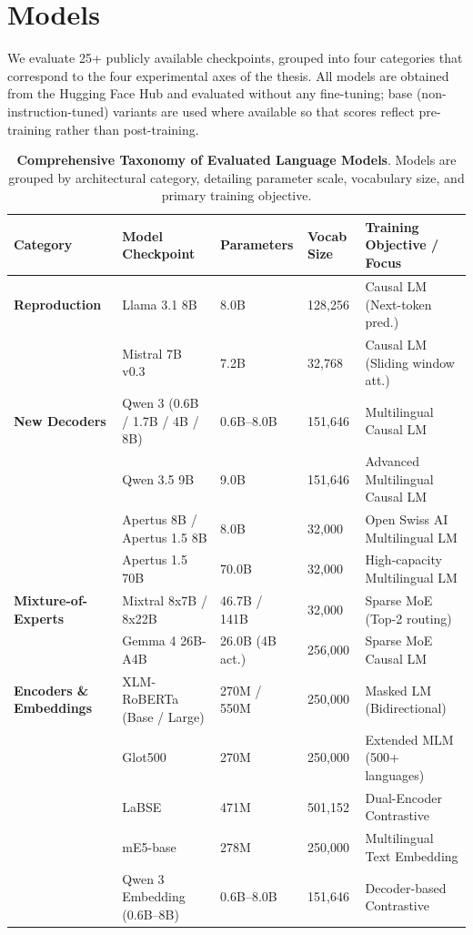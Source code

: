 \section{Models}
\label{sec:models}

We evaluate 25+ publicly available checkpoints, grouped into four
categories that correspond to the four experimental axes of the thesis.
All models are obtained from the Hugging Face Hub and evaluated without
any fine-tuning; base (non-instruction-tuned) variants are used where
available so that scores reflect pre-training rather than post-training.

\begin{table}[H]
\centering
\caption{\textbf{Comprehensive Taxonomy of Evaluated Language Models}. Models are grouped by architectural category, detailing parameter scale, vocabulary size, and primary training objective.}
\label{tab:evaluated-models-spec}
\small
\begin{tabular}{lllll}
\toprule
\textbf{Category} & \textbf{Model Checkpoint} & \textbf{Parameters} & \textbf{Vocab Size} & \textbf{Training Objective / Focus} \\
\midrule
\textbf{Reproduction}
  & Llama 3.1 8B & 8.0B & 128,256 & Causal LM (Next-token pred.) \\
  & Mistral 7B v0.3 & 7.2B & 32,768 & Causal LM (Sliding window att.) \\
\midrule
\textbf{New Decoders}
  & Qwen 3 (0.6B / 1.7B / 4B / 8B) & 0.6B--8.0B & 151,646 & Multilingual Causal LM \\
  & Qwen 3.5 9B & 9.0B & 151,646 & Advanced Multilingual Causal LM \\
  & Apertus 8B / Apertus 1.5 8B & 8.0B & 32,000 & Open Swiss AI Multilingual LM \\
  & Apertus 1.5 70B & 70.0B & 32,000 & High-capacity Multilingual LM \\
\midrule
\textbf{Mixture-of-Experts}
  & Mixtral 8x7B / 8x22B & 46.7B / 141B & 32,000 & Sparse MoE (Top-2 routing) \\
  & Gemma 4 26B-A4B & 26.0B (4B act.) & 256,000 & Sparse MoE Causal LM \\
\midrule
\textbf{Encoders \& Embeddings}
  & XLM-RoBERTa (Base / Large) & 270M / 550M & 250,000 & Masked LM (Bidirectional) \\
  & Glot500 & 270M & 250,000 & Extended MLM (500+ languages) \\
  & LaBSE & 471M & 501,152 & Dual-Encoder Contrastive \\
  & mE5-base & 278M & 250,000 & Multilingual Text Embedding \\
  & Qwen 3 Embedding (0.6B--8B) & 0.6B--8.0B & 151,646 & Decoder-based Contrastive \\
\bottomrule
\end{tabular}
\end{table}

